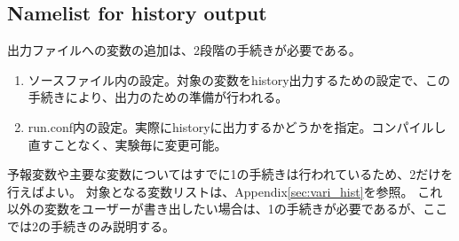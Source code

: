 \subsection{Namelist for history output}
出力ファイルへの変数の追加は、2段階の手続きが必要である。
\begin{enumerate}
\item ソースファイル内の設定。対象の変数をhistory出力するための設定で、この手続きにより、出力のための準備が行われる。
\item run.conf内の設定。実際にhistoryに出力するかどうかを指定。コンパイルし直すことなく、実験毎に変更可能。
\end{enumerate}
予報変数や主要な変数についてはすでに1の手続きは行われているため、2だけを行えばよい。
対象となる変数リストは、Appendix\ref{sec:vari_hist}を参照。
これ以外の変数をユーザーが書き出したい場合は、1の手続きが必要であるが、ここでは2の手続きのみ説明する。



